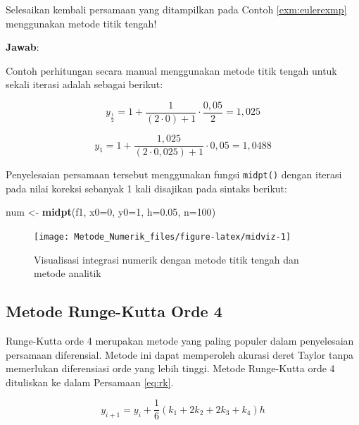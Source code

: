 \documentclass[]{book}
\newenvironment{Shaded}{\begin{snugshade}}{\end{snugshade}}
\newcommand{\DataTypeTok}[1]{\textcolor[rgb]{0.13,0.29,0.53}{#1}}
\newcommand{\DecValTok}[1]{\textcolor[rgb]{0.00,0.00,0.81}{#1}}
\newcommand{\FloatTok}[1]{\textcolor[rgb]{0.00,0.00,0.81}{#1}}
\newcommand{\KeywordTok}[1]{\textcolor[rgb]{0.13,0.29,0.53}{\textbf{#1}}}
\newcommand{\NormalTok}[1]{#1}
\newcommand{\StringTok}[1]{\textcolor[rgb]{0.31,0.60,0.02}{#1}}
\theoremstyle{definition}
\theoremstyle{definition}
\theoremstyle{definition}
\theoremstyle{remark}
\let\BeginKnitrBlock\begin \let\EndKnitrBlock\end
\begin{document}
\BeginKnitrBlock{example}
\protect\hypertarget{exm:midexmp}{}{\label{exm:midexmp} }Selesaikan kembali persamaan yang ditampilkan pada Contoh \ref{exm:eulerexmp} menggunakan metode titik tengah!
\EndKnitrBlock{example}

\textbf{Jawab}:

Contoh perhitungan secara manual menggunakan metode titik tengah untuk sekali iterasi adalah sebagai berikut:

\[
y_{\frac{1}{2}}=1+\frac{1}{\left(2\cdot 0\right)+1}\cdot\frac{0,05}{2}=1,025
\]

\[
y_{1}=1+\frac{1,025}{\left(2\cdot 0,025\right)+1}\cdot0,05=1,0488
\]

Penyelesaian persamaan tersebut menggunakan fungsi \texttt{midpt()} dengan iterasi pada nilai koreksi sebanyak 1 kali disajikan pada sintaks berikut:

\begin{Shaded}
\begin{Highlighting}[]
\NormalTok{num <-}\StringTok{ }\KeywordTok{midpt}\NormalTok{(f1, }\DataTypeTok{x0=}\DecValTok{0}\NormalTok{, }\DataTypeTok{y0=}\DecValTok{1}\NormalTok{, }\DataTypeTok{h=}\FloatTok{0.05}\NormalTok{, }\DataTypeTok{n=}\DecValTok{100}\NormalTok{)}
\end{Highlighting}
\end{Shaded}

\begin{figure}

{\centering \texttt{[image: Metode\_Numerik\_files/figure-latex/midviz-1]} 

}

\caption{Visualisasi integrasi numerik dengan metode titik tengah dan metode analitik}\label{fig:midviz}
\end{figure}

\hypertarget{rungekutta}{%
\subsection{Metode Runge-Kutta Orde 4}\label{rungekutta}}

Runge-Kutta orde 4 merupakan metode yang paling populer dalam penyelesaian persamaan diferensial. Metode ini dapat memperoleh akurasi deret Taylor tanpa memerlukan diferensiasi orde yang lebih tinggi. Metode Runge-Kutta orde 4 dituliskan ke dalam Persamaan \eqref{eq:rk}.

\begin{equation}
y_{i+1}=y_i+\frac{1}{6}\left(k_1+2k_2+2k_3+k_4\right)h
  \label{eq:rk}
\end{equation}
\end{document}
